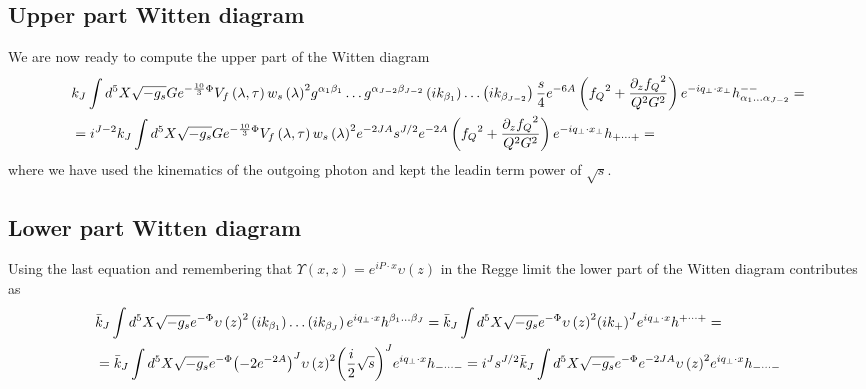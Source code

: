 \documentclass[a4paper,12pt]{article}
\begin{document}
\subsection{Upper part Witten diagram}
We are now ready to compute the upper part of the Witten diagram
\begin{align}
&k_J \int d^5X \sqrt{-g_s} G e^{-\frac{10}{3}\Phi} V_f \left( \lambda, \tau \right) {w_s\left(\lambda \right)}^2 g^{\alpha_1 \beta_1} \dots g^{\alpha_{J-2} \beta_{J-2}} \left( i k_{\beta_1}\right) \dots  \left( i k_{\beta_{J-2}}\right)  \frac{s}{4} e^{-6A} \left(  {f_Q}^2 + \frac{{\partial_z f_Q}^2}{Q^2 G^2}  \right) e^{-i q_\perp \cdot x_\perp} h^{--}_{\alpha_1 \dots \alpha_{J-2}} = \notag \\
& = i^{J-2} k_J \int d^5X \sqrt{-g_s} G e^{-\frac{10}{3}\Phi} V_f \left( \lambda, \tau \right) {w_s\left(\lambda \right)}^2 e^{-2 J A}  s^{J/2} e^{-2A} \left(  {f_Q}^2 + \frac{{\partial_z f_Q}^2}{Q^2 G^2}  \right) e^{-i q_\perp \cdot x_\perp} h_{+ \dots +} =
\end{align}
where we have used the kinematics of the outgoing photon and kept the leadin term power of $\sqrt{s}$.

\subsection{Lower part Witten diagram}
Using the last equation and remembering that $\Upsilon\left(x, z\right) = e^{i P \cdot x} \upsilon\left(z\right)$ in the Regge limit the lower part of the Witten diagram contributes as
\begin{align}
&\bar{k}_J \int d^5 X \sqrt{-g_s} e^{-\Phi}  {\upsilon\left(z\right)}^2 \left( i k_{\beta_1}\right) \dots \left( i k_{\beta_J}\right) e^{i q_\perp \cdot x}  h^{\beta_1 \dots \beta_J} = \bar{k}_J \int d^5 X \sqrt{-g_s} e^{-\Phi}  {\upsilon\left(z\right)}^2 {\left( i k_+\right)}^J e^{i q_\perp \cdot x}  h^{+ \dots +} = \notag \\
& = \bar{k}_J \int d^5 X \sqrt{-g_s} e^{-\Phi} {\left( - 2 e^{-2 A}\right)}^J {\upsilon\left(z\right)}^2 {\left( \frac{i}{2} \sqrt{s}\right)}^J e^{i q_\perp \cdot x}  h_{- \dots -}  = i^J s^{J/2}  \bar{k}_J \int d^5 X \sqrt{-g_s} e^{-\Phi} e^{-2 J A} {\upsilon\left(z\right)}^2 e^{i q_\perp \cdot x}  h_{- \dots -}
\end{align}
\end{document}
